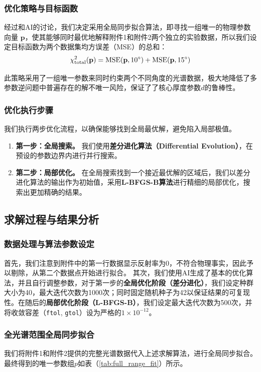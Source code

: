 \documentclass[a4paper]{ctexart}
\begin{document}
\subsubsection{优化策略与目标函数}
经过和AI\cite{ai:claude}的讨论，我们决定采用全局同步拟合算法，即寻找一组唯一的物理参数向量 $\mathbf{p}$，使其能够同时最优地解释附件1和附件2两个独立的实验数据，所以我们设定目标函数为两个数据集均方误差（MSE）的总和：
\begin{equation}
    \chi^2_{\text{total}}(\mathbf{p}) = \text{MSE}(\mathbf{p}, \text{\ang{10}}) + \text{MSE}(\mathbf{p}, \text{\ang{15}})
\end{equation}

此策略采用了一组唯一参数来同时约束两个不同角度的光谱数据，极大地降低了多参数逆问题中普遍存在的解不唯一风险，保证了了核心厚度参数$d$的鲁棒性。
\subsubsection{优化执行步骤}
我们执行两步优化流程，以确保能够找到全局最优解，避免陷入局部极值。
\begin{enumerate}
    \item \textbf{第一步：全局搜索。} 我们使用\textbf{差分进化算法（Differential Evolution）}，在预设的参数边界内进行并行搜索。
    \item \textbf{第二步：局部优化。} 在全局搜索找到一个接近最优解的区域后，我们以差分进化算法的输出作为初始值，采用\textbf{L-BFGS-B算法}进行精细的局部优化，搜索出更加精确的结果。
\end{enumerate}



\subsection{求解过程与结果分析}
\subsubsection{数据处理与算法参数设定}
首先，我们注意到附件中的第一行数据显示反射率为0，不符合物理事实，因此予以剔除，从第二个数据点开始进行拟合。
其次，我们使用AI\cite{ai:deepseek}生成了基本的优化算法，并且自行调整参数，对于第一步的\textbf{全局优化阶段（差分进化）}，我们设定种群大小为40，最大迭代次数为1000次；同时固定随机种子为42以保证结果的可复现性。在随后的\textbf{局部优化阶段（L-BFGS-B）}，我们设定最大迭代次数为500次，并将收敛容差（\texttt{ftol}, \texttt{gtol}）设为严格的$1 \times 10^{-12}$。

\subsubsection{全光谱范围全局同步拟合}
我们将附件1和附件2提供的完整光谱数据代入上述求解算法，进行全局同步拟合。最终得到的唯一参数组$p$如表（\ref{tab:full_range_fit}）所示。
\end{document}
